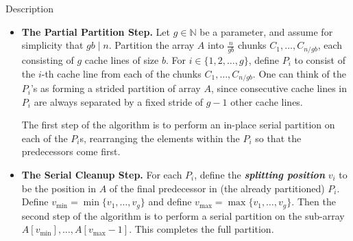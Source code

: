 \documentclass{beamer}
\newcommand{\defn}[1]       {{\textit{\textbf{\boldmath #1}}}}
\begin{document}
\begin{frame}[t]{Description}
\begin{itemize}
\item \textbf{The Partial Partition Step.} Let $g \in \mathbb{N}$ be a
  parameter, and assume for simplicity that $gb \mid n$. Partition the
  array $A$ into $\frac{n}{gb}$ chunks $C_1, \ldots, C_{n / gb}$,
  each consisting of $g$ cache lines of size $b$.
	For $i \in \{1, 2, \ldots, g\}$, define 
  $P_i$ to consist of the $i$-th cache line from each of the
  chunks $C_1, \ldots, C_{n / gb}$. One can think of the $P_i$'s
	as forming a strided partition of array $A$, since
  consecutive cache lines in $P_i$ are always separated by a fixed
  stride of $g - 1$ other cache lines.

  The first step of the algorithm is to perform an in-place serial
  partition on each of the $P_i$s, rearranging the elements within the
  $P_i$ so that the predecessors come first. %
\item \textbf{The Serial Cleanup Step. }For each $P_i$, define the \defn{splitting position} $v_i$ to be
  the position in $A$ of the final predecessor in (the already
  partitioned) $P_i$. Define $v_{\text{min}} = \min\{v_1, \ldots,
  v_{g}\}$ and define $v_{\text{max}} = \max\{v_1, \ldots, v_{g}\}$. Then the
  second step of the algorithm is to perform a serial partition on the
	sub-array \\$A[v_{\text{min}}],\ldots, A[v_{\text{max}}-1]$. This completes the   
    full partition.
\end{itemize}

\end{frame}
\end{document}
